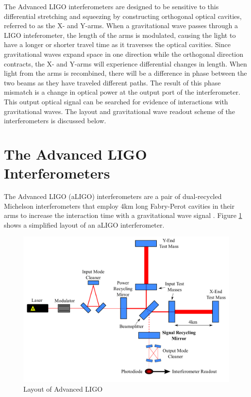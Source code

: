 The Advanced LIGO interferometers \cite{aLIGO} are designed to be sensitive 
to this differential stretching and squeezing by constructing orthogonal 
optical cavities, referred to as the X- and Y-arms. 
When a gravitational wave passes through a LIGO inteferometer, the length of 
the arms is modulated, causing the light to have a
longer or shorter travel time as it traverses the optical cavities. 
Since gravitational
waves expand space in one direction while the orthogonal direction contracts,     
the X- and Y-arms will experience differential changes in length. When light
from the arms is recombined, there will be a difference
in phase between the two beams as they have traveled different paths. 
The result of this phase mismatch is a change in optical power at the output 
port of the interferometer. This output optical signal can be searched for 
evidence of interactions with gravitational waves.
The layout and gravitational wave readout scheme of the interferometers is 
discussed below.

\section{The Advanced LIGO Interferometers}\label{sec:aligo}

The Advanced LIGO (aLIGO) interferometers are a pair of dual-recycled Michelson interferometers 
that employ 4km long Fabry-Perot cavities in their arms to increase the interaction time with a 
gravitational wave signal \cite{aLIGO}. 
Figure \ref{fig:aligo} shows a simplified layout of an aLIGO interferometer. 

\begin{figure}[ht!]
\includegraphics[width=\textwidth]{figures/introduction/ALIGO_layout}
\caption[Layout of Advanced LIGO]{Layout of Advanced LIGO}
\label{fig:aligo}
\end{figure}

